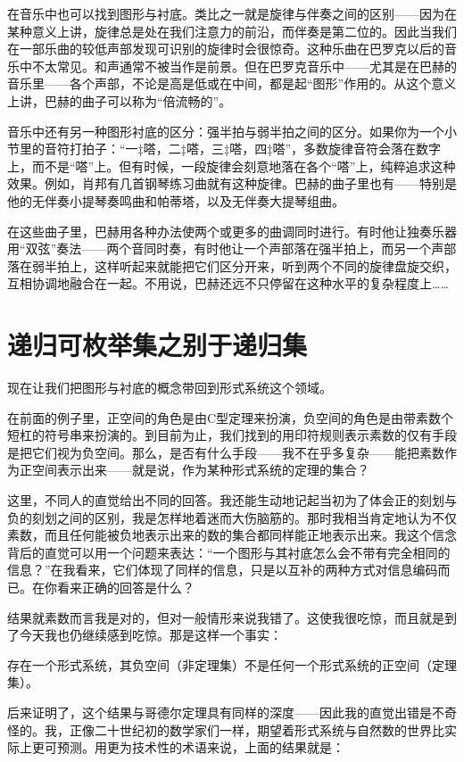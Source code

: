 在音乐中也可以找到图形与衬底。类比之一就是旋律与伴奏之间的区别——因为在某种意义上讲，旋律总是处在我们注意力的前沿，而伴奏是第二位的。因此当我们在一部乐曲的较低声部发现可识别的旋律时会很惊奇。这种乐曲在巴罗克以后的音乐中不太常见。和声通常不被当作是前景。但在巴罗克音乐中——尤其是在巴赫的音乐里——各个声部，不论是高是低或在中间，都是起“图形”作用的。从这个意义上讲，巴赫的曲子可以称为“倍流畅的”。

音乐中还有另一种图形衬底的区分：强半拍与弱半拍之间的区分。如果你为一个小节里的音符打拍子：“一‡嗒，二‡嗒，三‡嗒，四‡嗒”，多数旋律音符会落在数字上，而不是“嗒”上。但有时候，一段旋律会刻意地落在各个“嗒”上，纯粹追求这种效果。例如，肖邦有几首钢琴练习曲就有这种旋律。巴赫的曲子里也有——特别是他的无伴奏小提琴奏鸣曲和帕蒂塔，以及无伴奏大提琴组曲。

在这些曲子里，巴赫用各种办法使两个或更多的曲调同时进行。有时他让独奏乐器用“双弦”奏法——两个音同时奏，有时他让一个声部落在强半拍上，而另一个声部落在弱半拍上，这样听起来就能把它们区分开来，听到两个不同的旋律盘旋交织，互相协调地融合在一起。不用说，巴赫还远不只停留在这种水平的复杂程度上……

\section{递归可枚举集之别于递归集}

现在让我们把图形与衬底的概念带回到形式系统这个领域。

在前面的例子里，正空间的角色是由C型定理来扮演，负空间的角色是由带素数个短杠的符号串来扮演的。到目前为止，我们找到的用印符规则表示素数的仅有手段是把它们视为负空间。那么，是否有什么手段——我不在乎多复杂——能把素数作为正空间表示出来——就是说，作为某种形式系统的定理的集合？

这里，不同人的直觉给出不同的回答。我还能生动地记起当初为了体会正的刻划与负的刻划之间的区别，我是怎样地着迷而大伤脑筋的。那时我相当肯定地认为不仅素数，而且任何能被负地表示出来的数的集合都同样能正地表示出来。我这个信念背后的直觉可以用一个问题来表达：“一个图形与其衬底怎么会不带有完全相同的信息？”在我看来，它们体现了同样的信息，只是以互补的两种方式对信息编码而已。在你看来正确的回答是什么？

结果就素数而言我是对的，但对一般情形来说我错了。这使我很吃惊，而且就是到了今天我也仍继续感到吃惊。那是这样一个事实：

\begin{block}
存在一个形式系统，其负空间（非定理集）不是任何一个形式系统的正空间（定理集）。
\end{block}
后来证明了，这个结果与哥德尔定理具有同样的深度——因此我的直觉出错是不奇怪的。我，正像二十世纪初的数学家们一样，期望着形式系统与自然数的世界比实际上更可预测。用更为技术性的术语来说，上面的结果就是：

